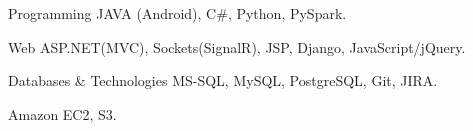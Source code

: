 

\begin{cvskills}

  \cvskill
    {Programming} %
    {JAVA (Android), C\#, Python, PySpark.} %

  \cvskill
    {Web} %
    {ASP.NET(MVC), Sockets(SignalR), JSP, Django, JavaScript/jQuery.} %

  \cvskill
    {Databases \& Technologies} %
    {MS-SQL, MySQL, PostgreSQL, Git, JIRA.} %

{Amazon EC2, S3.}
\end{cvskills}

